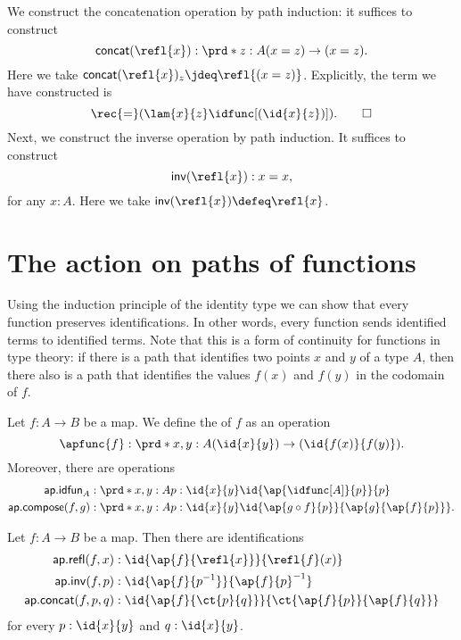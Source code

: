 \begin{constr}
We construct the concatenation operation by path induction: it suffices to construct
\begin{equation*}
\mathsf{concat}(\refl{x}):\prd*{z:A} (x=z)\to(x=z).
\end{equation*}
Here we take $\mathsf{concat}(\refl{x})_z \jdeq \refl{(x=z)}$. 
Explicitly, the term we have constructed is
\begin{equation*}
\rec{=}(\lam{x}{z}\idfunc[(\id{x}{z})]).\qedhere
\end{equation*}
Next, we construct the inverse operation by path induction. It suffices to construct
\begin{equation*}
\mathsf{inv}(\refl{x}): x=x,
\end{equation*}
for any $x:A$. Here we take $\mathsf{inv}(\refl{x})\defeq \refl{x}$.
\end{constr}

\section{The action on paths of functions}

Using the induction principle of the identity type we can show that every function preserves identifications.
In other words, every function sends identified terms to identified terms.
Note that this is a form of continuity for functions in type theory: if there is a path that identifies two points $x$ and $y$ of a type $A$, then there also is a path that identifies the values $f(x)$ and $f(y)$ in the codomain of $f$. 

\begin{defn}
Let $f:A\to B$ be a map. We define the  of $f$ as an operation
\begin{equation*}
\apfunc{f} : \prd*{x,y:A} (\id{x}{y})\to(\id{f(x)}{f(y)}).
\end{equation*}
Moreover, there are operations
\begin{align*}
\mathsf{ap.idfun}_A & : \prd*{x,y:A}{p:\id{x}{y}} \id{\ap{\idfunc[A]}{p}}{p} \\
\mathsf{ap.compose}(f,g) & : \prd*{x,y:A}{p:\id{x}{y}} \id{\ap{g\circ f}{p}}{\ap{g}{\ap{f}{p}}}.
\end{align*}
\end{defn}

\begin{defn}
Let $f:A\to B$ be a map. Then there are identifications
\begin{align*}
\mathsf{ap.refl}(f,x) & : \id{\ap{f}{\refl{x}}}{\refl{f}(x)} \\
\mathsf{ap.inv}(f,p) & : \id{\ap{f}{p^{-1}}}{\ap{f}{p}^{-1}} \\
\mathsf{ap.concat}(f,p,q) & : \id{\ap{f}{\ct{p}{q}}}{\ct{\ap{f}{p}}{\ap{f}{q}}}
\end{align*}
for every $p:\id{x}{y}$ and $q:\id{x}{y}$.
\end{defn}

